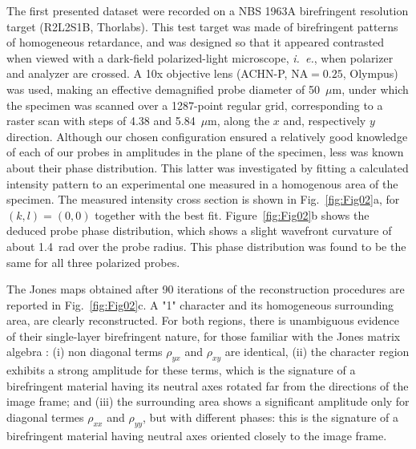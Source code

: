 \documentclass[aps,prl,twocolumn,amsmath]{revtex4-1}
\begin{document}
The first presented dataset were recorded on a NBS 1963A birefringent resolution target (R2L2S1B, Thorlabs). This test target was made of birefringent patterns of homogeneous retardance, and was designed so that it appeared contrasted when viewed with a dark-field polarized-light microscope, \emph{i.~e.}, when polarizer and analyzer are crossed. A 10x objective lens (ACHN-P, NA$=0.25$, Olympus) was used, making an effective demagnified probe diameter of 50~$\mu$m, under which the specimen was scanned over a 1287-point regular grid, corresponding to a raster scan with steps of 4.38 and 5.84~$\mu$m, along the $x$ and, respectively $y$ direction. Although our chosen configuration ensured a relatively good knowledge of each of our probes in amplitudes in the plane of the specimen, less was known about their phase distribution. This latter was investigated by fitting a calculated intensity pattern to an experimental one measured in a homogenous area of the specimen. The measured intensity cross section is shown in Fig.~\ref{fig:Fig02}a, for $(k,l)=(0,0)$ together with the best fit. Figure~\ref{fig:Fig02}b shows the deduced probe phase distribution, which shows a slight wavefront curvature of about 1.4~rad over the probe radius. This phase distribution was found to be the same for all three polarized probes.

The Jones maps obtained after 90 iterations of the reconstruction procedures are reported in Fig.~\ref{fig:Fig02}c. A "1" character and its homogeneous surrounding area, are clearly reconstructed. For both regions, there is unambiguous evidence of their single-layer birefringent nature, for those familiar with the Jones matrix algebra \cite{Jones41b}: (i) non diagonal terms $\rho_{yx}$ and $\rho_{xy}$ are identical, (ii) the character region exhibits a strong amplitude for these terms, which is the signature of a birefringent material having its neutral axes rotated far from the directions of the image frame; and (iii) the surrounding area shows a significant amplitude only for diagonal termes $\rho_{xx}$ and $\rho_{yy}$, but with different phases: this is the signature of a birefringent material having neutral axes oriented closely to the image frame.
\end{document}
